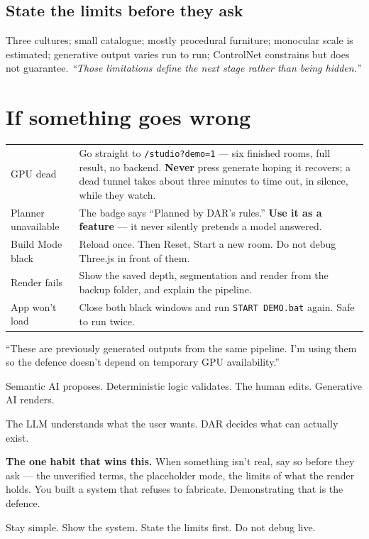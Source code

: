 \documentclass[10.5pt,a4paper]{article}
\begin{document}
\subsection*{State the limits before they ask}
Three cultures; small catalogue; mostly procedural furniture; monocular scale is estimated;
generative output varies run to run; ControlNet constrains but does not guarantee.
\emph{``Those limitations define the next stage rather than being hidden.''}

\section*{If something goes wrong}
\begin{tabularx}{\linewidth}{@{}lX@{}}
\toprule
GPU dead & Go straight to \texttt{/studio?demo=1} --- six finished rooms, full result, no backend.
  \textbf{Never} press generate hoping it recovers; a dead tunnel takes about three minutes to time
  out, in silence, while they watch.\\
Planner unavailable & The badge says ``Planned by DAR's rules.'' \textbf{Use it as a feature} --- it
  never silently pretends a model answered.\\
Build Mode black & Reload once. Then Reset, Start a new room. Do not debug Three.js in front of them.\\
Render fails & Show the saved depth, segmentation and render from the backup folder, and explain the
  pipeline.\\
App won't load & Close both black windows and run \texttt{START DEMO.bat} again. Safe to run twice.\\
\bottomrule
\end{tabularx}

\begin{strength}
``These are previously generated outputs from the same pipeline. I'm using them so the defence
doesn't depend on temporary GPU availability.''
\end{strength}

\vspace{0.6em}
\begin{sayit}
Semantic AI proposes. Deterministic logic validates. The human edits. Generative AI renders.
\end{sayit}
\begin{sayit}
The LLM understands what the user wants. DAR decides what can actually exist.
\end{sayit}

\vspace{0.8em}
{\color{muted}\small\textbf{The one habit that wins this.} When something isn't real, say so before
they ask --- the unverified terms, the placeholder mode, the limits of what the render holds. You
built a system that refuses to fabricate. Demonstrating that is the defence.\par
\vspace{0.3em}
Stay simple. Show the system. State the limits first. Do not debug live.}
\end{document}
